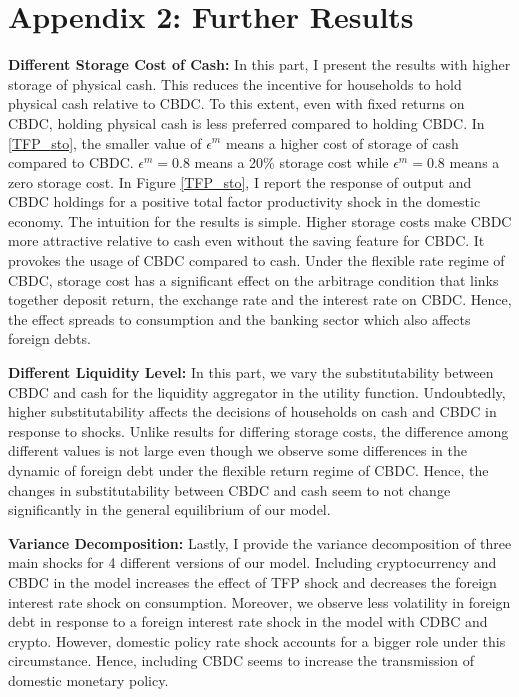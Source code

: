 \documentclass[12pt, a4paper]{article}
\begin{document}
\section{Appendix 2: Further Results}
\textbf{Different Storage Cost of Cash:} In this part, I present the results with higher storage of physical cash. This reduces the incentive for households to hold physical cash relative to CBDC. To this extent, even with fixed returns on CBDC, holding physical cash is less preferred compared to holding CBDC. In \ref{TFP_sto}, the smaller value of $\epsilon^m$ means a higher cost of storage of cash compared to CBDC. $\epsilon^m = 0.8$ means a 20\% storage cost while $\epsilon^m = 0.8$ means a zero storage cost. In Figure \ref{TFP_sto}, I report the response of output and CBDC holdings for a positive total factor productivity shock in the domestic economy. The intuition for the results is simple. Higher storage costs make CBDC more attractive relative to cash even without the saving feature for CBDC. It provokes the usage of CBDC compared to cash. Under the flexible rate regime of CBDC, storage cost has a significant effect on the arbitrage condition that links together deposit return, the exchange rate and the interest rate on CBDC. Hence, the effect spreads to consumption and the banking sector which also affects foreign debts.

\textbf{Different Liquidity Level:} In this part, we vary the substitutability between CBDC and cash for the liquidity aggregator in the utility function. Undoubtedly, higher substitutability affects the decisions of households on cash and CBDC in response to shocks. Unlike results for differing storage costs, the difference among different values is not large even though we observe some differences in the dynamic of foreign debt under the flexible return regime of CBDC. Hence, the changes in substitutability between CBDC and cash seem to not change significantly in the general equilibrium of our model.


\textbf{Variance Decomposition:} Lastly, I provide the variance decomposition of three main shocks for 4 different versions of our model. Including cryptocurrency and CBDC in the model increases the effect of TFP shock and decreases the foreign interest rate shock on consumption. Moreover, we observe less volatility in foreign debt in response to a foreign interest rate shock in the model with CDBC and crypto. However, domestic policy rate shock accounts for a bigger role under this circumstance. Hence, including CBDC seems to increase the transmission of domestic monetary policy.
\end{document}
